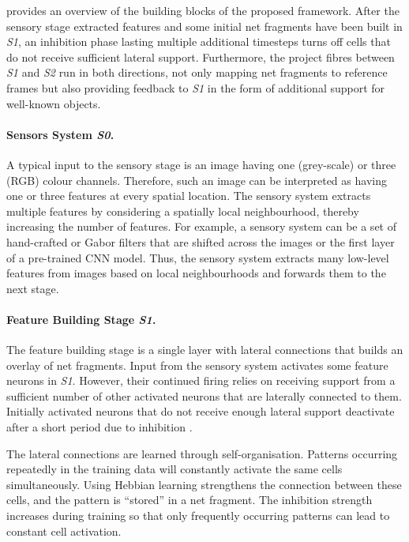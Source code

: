  provides an overview of the building blocks of the proposed framework. After the sensory stage extracted features and some initial net fragments have been built in \emph{S1}, an inhibition phase lasting multiple additional timesteps turns off cells that do not receive sufficient lateral support. Furthermore, the project fibres between \emph{S1} and \emph{S2} run in both directions, not only mapping net fragments to reference frames but also providing feedback to \emph{S1} in the form of additional support for well-known objects.

\paragraph{Sensors System \emph{S0}.} A typical input to the sensory stage is an image having one (grey-scale) or three (RGB) colour channels. Therefore, such an image can be interpreted as having one or three features at every spatial location.
The sensory system extracts multiple features by considering a spatially local neighbourhood, thereby increasing the number of features.
For example, a sensory system can be a set of hand-crafted or Gabor filters that are shifted across the images or the first layer of a pre-trained CNN model.
Thus, the sensory system extracts many low-level features from images based on local neighbourhoods and forwards them to the next stage.

\paragraph{Feature Building Stage \emph{S1}.} The feature building stage is a single layer with lateral connections  that builds an overlay of net fragments. Input from the sensory system activates some feature neurons in \emph{S1}. However, their continued firing relies on receiving support from a sufficient number of other activated neurons that are laterally connected to them. Initially activated neurons that do not receive enough lateral support deactivate after a short period due to inhibition .

The lateral connections are learned through self-organisation. Patterns occurring repeatedly in the training data will constantly activate the same cells simultaneously. Using Hebbian learning strengthens the connection between these cells, and the pattern is ``stored'' in a net fragment. The inhibition strength increases during training so that only frequently occurring patterns can lead to constant cell activation.

